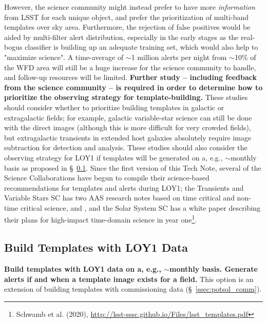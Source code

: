 \documentclass[DM,toc]{lsstdoc}
\begin{document}
However, the science community might instead prefer to have more {\em information} from LSST for each unique object, and prefer the prioritization of multi-band templates over sky area.
Furthermore, the rejection of false positives would be aided by multi-filter alert distribution, especially in the early stages as the real-bogus classifier is building up an adequate training set, which would also help to "maximize science".
A time-average of $\sim$1 million alerts per night from $\sim$10\% of the WFD area will still be a huge increase for the science community to handle, and follow-up resources will be limited.
{\bf Further study -- including feedback from the science community -- is required in order to determine how to prioritize the observing strategy for template-building.}
These studies should consider whether to prioritize building templates in galactic or extragalactic fields; for example, galactic variable-star science can still be done with the direct images (although this is more difficult for very crowded fields), but extragalactic transients in extended host galaxies absolutely require image subtraction for detection and analysis.
These studies should also consider the observing strategy for LOY1 if templates will be generated on a, e.g., $\sim$monthly basis as proposed in \S~\ref{ssec:potsol_cont}.
Since the first version of this Tech Note, several of the Science Collaborations have begun to compile their science-based recommendations for templates and alerts during LOY1; the Transients and Variable Stars SC has two AAS research notes based on time critical and non-time critical science, \citet{2020RNAAS...4...41S} and \citet{2020RNAAS...4...40H}, and the Solar System SC has a white paper describing their plans for high-impact time-domain science in year one\footnote{Schwamb et al. (2020), \url{http://lsst-sssc.github.io/Files/lsst_templates.pdf}}.



\clearpage
\subsection{Build Templates with LOY1 Data}\label{ssec:potsol_cont}

{\bf Build templates with LOY1 data on a, e.g., $\sim$monthly basis. Generate alerts if and when a template image exists for a field.} This option is an extension of building templates with commissioning data (\S~\ref{ssec:potsol_comm}).
\end{document}
